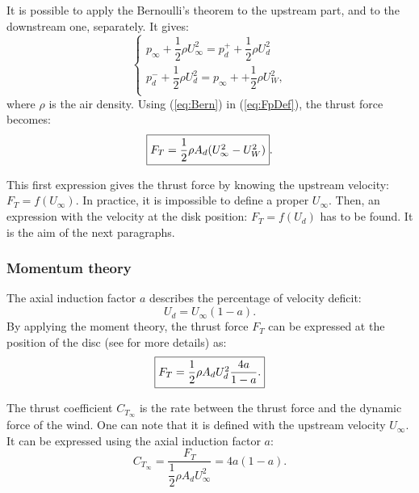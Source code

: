 It is possible to apply the Bernoulli’s theorem to the upstream part, and to the downstream one, separately. It gives: 
\begin{equation}
\label{eq:Bern}
\left\lbrace
\begin{array}{ccc}		
p_\infty + \dfrac{1}{2} \rho U_\infty^2 = p_d^+ + \dfrac{1}{2} \rho U_d^2
\\
p_d^- + \dfrac{1}{2} \rho U_d^2 = p_\infty+ + \dfrac{1}{2} \rho U_W^2,
\\
\end{array}\right.
\end{equation}
where $\rho$ is the air density. Using (\ref{eq:Bern}) in (\ref{eq:FpDef}), the thrust force becomes:
\begin{equation}
\fbox{$
F_T = \dfrac{1}{2} \rho A_d (U_\infty^2 -  U_W^2)
$}.
\label{eq:FpBern}
\end{equation}		

This first expression gives the thrust force by knowing the upstream velocity: $F_T = f(U_\infty)$. In practice, it is impossible to define a proper $U_\infty$. Then, an expression with the velocity at the disk position: $F_T = f(U_d)$ has to be found. It is the aim of the next paragraphs.



		\subsubsection*{Momentum theory}
				\label{p:ADNRAppliTheo}
The axial induction factor $a$ describes the percentage of velocity deficit:
\begin{equation}
U_d = U_\infty( 1 - a ).
\label{eq:a}
\end{equation}
By applying the moment theory, the thrust force $F_T$ can be expressed at the position of the disc (see \citet{joulin2019modelisation} for more details) as:
\begin{equation}	
\label{eq:FpD}	
\fbox{$
F_T = \dfrac{1}{2} \rho A_d U_d^2 \dfrac{4a}{1-a}.
$}			
\end{equation}

The thrust coefficient $C_{T_\infty}$ is the rate between the thrust force and the dynamic force of the wind. One can note that it is defined with the upstream velocity $U_\infty$. It can be expressed using the axial induction factor $a$:
\begin{equation}	
\label{eq:ct}	
C_{T_\infty} = \dfrac{F_T}{\dfrac{1}{2} \rho A_d U_\infty^2} = 4 a (1 -a).
\end{equation}	

